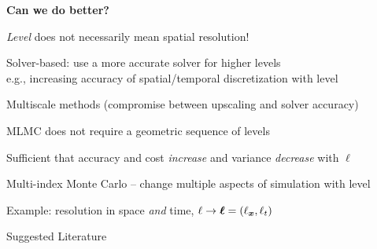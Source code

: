 \begin{frame}{\name{}}

    \textbf{Can we do better?}\vskip2mm
    \begin{squarelist}
        \item<2-> \emph{Level} does not necessarily mean spatial resolution!
        \begin{circlelist}
            \item Solver-based: use a more accurate solver for higher levels\\
            e.g., increasing accuracy of spatial/temporal discretization with level
            \item Multiscale methods (compromise between upscaling and solver accuracy)
        \end{circlelist}
        \item<3-> MLMC does not require a geometric sequence of levels 
        \begin{circlelist}
            \item Sufficient that accuracy and cost \emph{increase} and variance \emph{decrease} with $\ell$
        \end{circlelist}
        \item<4-> Multi-index Monte Carlo -- change multiple aspects of simulation with
        level
        \begin{circlelist}
            \item Example: resolution in space \emph{and} time, $\ell \rightarrow \bm{\ell} = (\ell_{\bm{x}}, \ell_t)$
        \end{circlelist}
    \end{squarelist}
    
\end{frame}

\def\name{Suggested Literature}

\begin{frame}{\name{}}
	\begin{scriptsize}
    	
	\end{scriptsize}
\end{frame}
